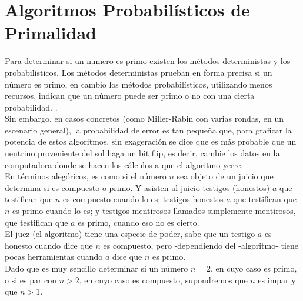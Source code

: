 \chapter{Algoritmos Probabilísticos de Primalidad}
Para determinar si un numero es primo existen los métodos deterministas y los probabilísticos. Los métodos deterministas prueban en forma precisa si un número es primo, en cambio los métodos probabilísticos, utilizando menos recursos, indican que un número puede ser primo o no con una cierta probabilidad. \cite{rempegillen2014primality} \cite{Rosen2019} \cite{smart2016cryptography}. \\
Sin embargo, en casos concretos (como Miller-Rabin con varias rondas, en un escenario general), la probabilidad de error es tan pequeña que, para graficar la potencia de estos algoritmos, sin exageración se dice que es más probable que un neutrino proveniente del sol haga un bit flip, es decir, cambie los datos en la computadora donde se hacen los cálculos a que el algoritmo yerre.\\

En términos alegóricos, es como si el número $n$ sea objeto de un juicio que determina si es compuesto o primo.
Y asisten al juicio testigos (honestos) $a$ que testifican que $n$ es compuesto cuando lo es; testigos honestos $a$ que testifican que $n$ es primo cuando lo es; y testigos mentirosos llamados simplemente mentirosos, que testifican que $a$ es primo, cuando eso no es cierto. \\
El juez (el algoritmo) tiene una especie de poder, sabe que un testigo $a$ es honesto cuando dice que $n$ es compuesto, pero -dependiendo del -algoritmo- tiene pocas herramientas cuando $a$ dice que $n$ es primo.\\

Dado que es muy sencillo determinar si un número $n=2$, en cuyo caso es primo, o si es par con $n>2$, en cuyo caso es compuesto, supondremos que $n$ es impar y que $n>1$.

